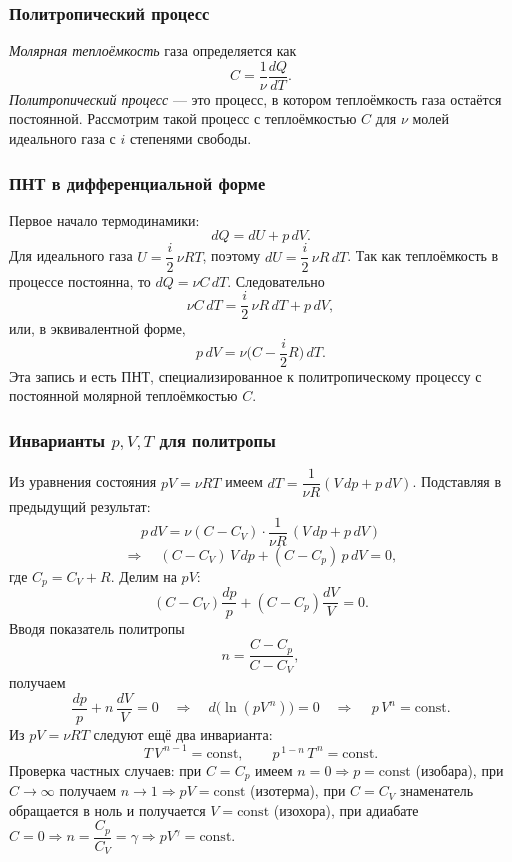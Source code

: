 \documentclass[12pt, a4paper]{article}%
\begin{document}
\subsubsection*{Политропический процесс}
\textit{Молярная теплоёмкость} газа определяется как
\[
C=\frac{1}{\nu}\frac{dQ}{dT}.
\]
\textit{Политропический процесс} — это процесс, в котором теплоёмкость газа остаётся постоянной. Рассмотрим такой процесс с теплоёмкостью \(C\) для \(\nu\) молей идеального газа с \(i\) степенями свободы.

\subsubsection*{ПНТ в дифференциальной форме}
Первое начало термодинамики: 
\[
dQ=dU+p\,dV.
\]
Для идеального газа \(U=\dfrac{i}{2}\,\nu R T\), поэтому \(dU=\dfrac{i}{2}\,\nu R\,dT\). Так как теплоёмкость в процессе постоянна, то \(dQ=\nu C\,dT\). Следовательно
\[
\nu C\,dT=\frac{i}{2}\,\nu R\,dT+p\,dV,
\]
или, в эквивалентной форме,
\[
p\,dV=\nu\bigl(C-\frac{i}{2}R\bigr)\,dT.
\]
Эта запись и есть ПНТ, специализированное к политропическому процессу с постоянной молярной теплоёмкостью \(C\).


\subsubsection*{Инварианты \(p,V,T\) для политропы}
Из уравнения состояния \(pV=\nu R T\) имеем \(dT=\dfrac{1}{\nu R}(V\,dp+p\,dV)\). Подставляя в предыдущий результат:
\[
p\,dV=\nu(C-C_V)\cdot\frac{1}{\nu R}\,(V\,dp+p\,dV)
\]
\[
\Longrightarrow\quad
(C-C_V)\,V\,dp+(C-C_p)\,p\,dV=0,
\]
где \(C_p=C_V+R\). Делим на \(pV\):
\[
(C-C_V)\frac{dp}{p}+(C-C_p)\frac{dV}{V}=0.
\]
Вводя показатель политропы
\[
n=\frac{C-C_p}{C-C_V},
\]
получаем
\[
\frac{dp}{p}+n\,\frac{dV}{V}=0
\quad\Longrightarrow\quad
d\bigl(\ln(pV^{\,n})\bigr)=0
\quad\Longrightarrow\quad
\,p\,V^{n}=\text{const}.
\]
Из \(pV=\nu R T\) следуют ещё два инварианта:
\[
T\,V^{\,n-1}=\text{const},\qquad
p^{\,1-n}\,T^{\,n}=\text{const}.
\]
Проверка частных случаев: при \(C=C_p\) имеем \(n=0\Rightarrow p=\text{const}\) (изобара), при \(C\to\infty\) получаем \(n\to1\Rightarrow pV=\text{const}\) (изотерма), при \(C=C_V\) знаменатель обращается в ноль и получается \(V=\text{const}\) (изохора), при адиабате \(C=0\Rightarrow n=\dfrac{C_p}{C_V}=\gamma\Rightarrow pV^{\gamma}=\text{const}\).
\end{document}
